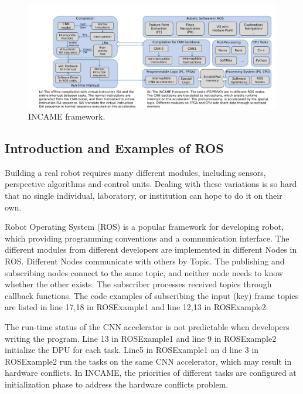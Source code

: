\label{sec:incame}

\begin{figure}[t]
	\centering
    \includegraphics[width=0.99\linewidth]{fig/incame.pdf}
    \caption{ INCAME framework.}
	\label{fig:incame}
\end{figure}

\subsection{Introduction and Examples of ROS}

Building a real robot requires many different modules, including sensors, perspective algorithms and control units. Dealing with these variations is so hard that no single individual, laboratory, or institution can hope to do it on their own.

Robot Operating System (ROS) \cite{quigley2009ros} is a popular framework for developing robot, which providing programming conventions and a communication interface. The different modules from different developers are implemented in different Nodes in ROS. Different Nodes communicate with others by Topic. The publishing and subscribing nodes connect to the same topic, and neither node needs to know whether the other exists. The subscriber processes received topics through callback functions. The code examples of subscribing the input (key) frame topics are listed in line 17,18 in ROSExample1 and line 12,13 in ROSExample2.

The run-time status of the CNN accelerator is not predictable when developers writing the program. Line 13 in ROSExample1 and line 9 in ROSExample2 initialize the DPU for each task. Line5 in ROSExample1 an d line 3 in ROSExample2 run the tasks on the same CNN accelerator, which may result in hardware conflicts. In INCAME, the priorities of different tasks are configured at initialization phase to address the hardware conflicts problem.


